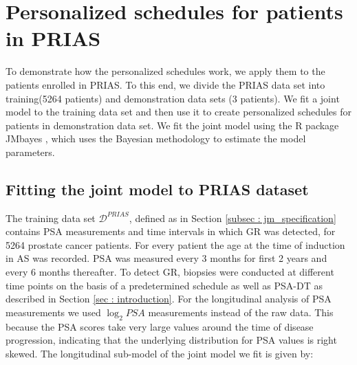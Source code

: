 
\section{Personalized schedules for patients in PRIAS}
\label{sec : pers_schedule_PRIAS}
To demonstrate how the personalized schedules work, we apply them to the patients enrolled in PRIAS. To this end, we divide the PRIAS data set into training(5264 patients) and demonstration data sets (3 patients). We fit a joint model to the training data set and then use it to create personalized schedules for patients in demonstration data set. We fit the joint model using the R package JMbayes \citep{rizopoulosJMbayes}, which uses the Bayesian methodology to estimate the model parameters.

\subsection{Fitting the joint model to PRIAS dataset}
\label{subsec : jm_fit_prias}
The training data set $\mathcal{D}^{PRIAS}$, defined as in Section \ref{subsec : jm_specification} contains PSA measurements and time intervals in which GR was detected, for 5264 prostate cancer patients. For every patient the age at the time of induction in AS was recorded. PSA was measured every 3 months for first 2 years and every 6 months thereafter. To detect GR, biopsies were conducted at different time points on the basis of a predetermined schedule as well as PSA-DT as described in Section \ref{sec : introduction}. For the longitudinal analysis of PSA measurements we used $\log_2 PSA$ measurements instead of the raw data. This because the PSA scores take very large values around the time of disease progression, indicating that the underlying distribution for PSA values is right skewed. The longitudinal sub-model of the joint model we fit is given by:

